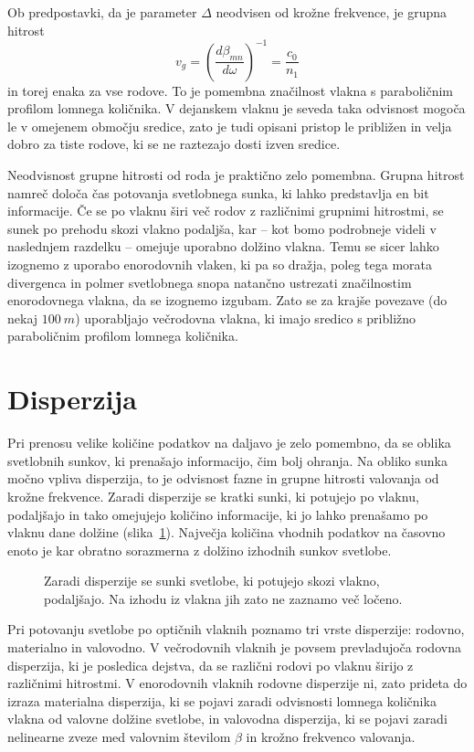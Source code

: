 Ob predpostavki, da je parameter $\Delta$ neodvisen od krožne frekvence, je grupna 
hitrost
\begin{equation}
v_{g}=\left(\frac{d\beta_{mn}}{d\omega}\right)^{-1}=\frac{c_{0}}{n_{1}}
\label{9.21}
\end{equation}
in torej enaka za vse rodove. To je pomembna značilnost vlakna s paraboličnim profilom
lomnega količnika. V dejanskem vlaknu je seveda taka odvisnost mogoča
le v omejenem območju sredice, zato je tudi opisani pristop le približen
in velja dobro za tiste rodove, ki se ne raztezajo dosti izven sredice.

Neodvisnost grupne hitrosti od roda je praktično zelo pomembna. 
Grupna hitrost namreč določa čas potovanja svetlobnega sunka, ki
lahko predstavlja en bit informacije. Če se po vlaknu širi več
rodov z različnimi grupnimi hitrostmi, se sunek po prehodu skozi
vlakno podaljša, kar -- kot bomo podrobneje videli v naslednjem razdelku -- omejuje 
uporabno dolžino vlakna. Temu se sicer lahko izognemo z uporabo enorodovnih vlaken,
ki pa so dražja, poleg tega morata divergenca in polmer svetlobnega snopa 
natančno ustrezati značilnostim enorodovnega vlakna, da se izognemo izgubam. 
Zato se za krajše povezave (do nekaj $100~\si{m}$) uporabljajo večrodovna vlakna, ki imajo sredico s 
približno paraboličnim profilom lomnega količnika.

\section{Disperzija}
\label{chap:Disperzija}
Pri prenosu velike količine podatkov na daljavo je zelo pomembno, da
se oblika svetlobnih sunkov, ki prenašajo informacijo, čim bolj ohranja.
Na obliko sunka močno vpliva disperzija, to je odvisnost fazne in grupne hitrosti
valovanja od krožne frekvence. Zaradi disperzije se kratki sunki, ki potujejo po vlaknu, podaljšajo in 
tako omejujejo količino informacije, ki jo lahko prenašamo po vlaknu dane dolžine
(slika~\ref{fig:disp}).
Največja količina vhodnih podatkov na časovno enoto je kar 
obratno sorazmerna z dolžino izhodnih sunkov svetlobe. 
\begin{figure}[ht]
\centering
\def\svgwidth{120truemm} 
 
\caption{Zaradi disperzije se sunki svetlobe, ki potujejo skozi vlakno, 
podaljšajo. Na izhodu iz vlakna jih zato ne zaznamo več ločeno.}
\label{fig:disp}
\end{figure}

Pri potovanju svetlobe po optičnih vlaknih poznamo tri 
vrste disperzije: rodovno, materialno in valovodno. V večrodovnih vlaknih
je povsem prevladujoča rodovna disperzija, ki je posledica dejstva, da se 
različni rodovi po vlaknu širijo z različnimi hitrostmi. 
V enorodovnih vlaknih rodovne disperzije ni, zato prideta do izraza 
materialna disperzija, ki se pojavi zaradi odvisnosti lomnega količnika 
vlakna od valovne dolžine svetlobe, in valovodna disperzija, ki se pojavi zaradi 
nelinearne zveze med valovnim številom $\beta$ in krožno frekvenco valovanja. 

